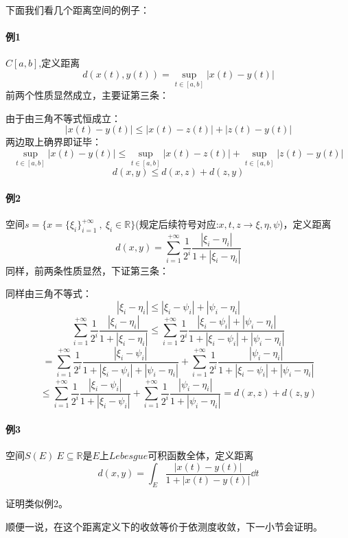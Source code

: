 下面我们看几个距离空间的例子：
\paragraph*{例1} \quad $C[a,b]$,定义距离
\[d(x(t),y(t))=\mathop{\text{sup}}\limits_{t \in [a,b]}\left|x(t)-y(t)\right|\]
前两个性质显然成立，主要证第三条：

由于由三角不等式恒成立：
\[\left|x(t)-y(t)\right| \leq \left|x(t)-z(t)\right|+\left|z(t)-y(t)\right|\]
两边取上确界即证毕：
\[\mathop{\text{sup}}\limits_{t \in [a,b]}\left|x(t)-y(t)\right| \leq \mathop{\text{sup}}\limits_{t \in [a,b]}\left|x(t)-z(t)\right|+\mathop{\text{sup}}\limits_{t \in [a,b]}\left|z(t)-y(t)\right|\]
\[d(x,y) \leq d(x,z)+d(z,y)\]

\paragraph*{例2} \quad 空间$s=\{x=\{\xi_i\}_{i=1}^{+\infty} \ , \ \xi_i \in \mathbb{R}\}$(规定后续符号对应:$x,t,z \rightarrow \xi,\eta,\psi$)，定义距离
\[d(x,y)=\sum_{i=1}^{+\infty}\frac{1}{2^i}\frac{|\xi_i-\eta_i|}{1+|\xi_i-\eta_i|}\]
同样，前两条性质显然，下证第三条：

同样由三角不等式：
\[\left|\xi_i-\eta_i\right| \leq \left|\xi_i-\psi_i\right|+\left|\psi_i-\eta_i\right|\]
\[\sum_{i=1}^{+\infty}\frac{1}{2^i}\frac{|\xi_i-\eta_i|}{1+|\xi_i-\eta_i|} \leq \sum_{i=1}^{+\infty}\frac{1}{2^i}\frac{\left|\xi_i-\psi_i\right|+\left|\psi_i-\eta_i\right|}{1+\left|\xi_i-\psi_i\right|+\left|\psi_i-\eta_i\right|}\]
\[=\sum_{i=1}^{+\infty}\frac{1}{2^i}\frac{\left|\xi_i-\psi_i\right|}{1+\left|\xi_i-\psi_i\right|+\left|\psi_i-\eta_i\right|}+\sum_{i=1}^{+\infty}\frac{1}{2^i}\frac{\left|\psi_i-\eta_i\right|}{1+\left|\xi_i-\psi_i\right|+\left|\psi_i-\eta_i\right|}\]
\[\leq \sum_{i=1}^{+\infty}\frac{1}{2^i}\frac{\left|\xi_i-\psi_i\right|}{1+\left|\xi_i-\psi_i\right|}+\sum_{i=1}^{+\infty}\frac{1}{2^i}\frac{\left|\psi_i-\eta_i\right|}{1+\left|\psi_i-\eta_i\right|}=d(x,z)+d(z,y)\]

\paragraph*{例3} \quad 空间$S(E) \ E \subseteq \mathbb{R}$是$E$上$Lebesgue$可积函数全体，定义距离
\[d(x,y)=\int_E\frac{\left|x(t)-y(t)\right|}{1+\left|x(t)-y(t)\right|}\dd t\]

证明类似例2。

顺便一说，在这个距离定义下的收敛等价于依测度收敛，下一小节会证明。

